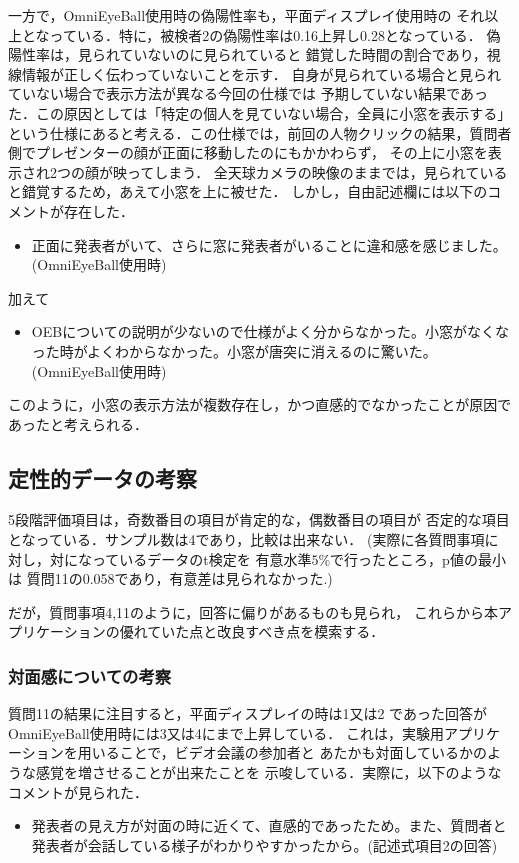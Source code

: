 一方で，OmniEyeBall使用時の偽陽性率も，平面ディスプレイ使用時の
それ以上となっている．特に，被検者2の偽陽性率は0.16上昇し0.28となっている．
偽陽性率は，見られていないのに見られていると
錯覚した時間の割合であり，視線情報が正しく伝わっていないことを示す．
自身が見られている場合と見られていない場合で表示方法が異なる今回の仕様では
予期していない結果であった．この原因としては「特定の個人を見ていない場合，全員に小窓を表示する」
という仕様にあると考える．この仕様では，前回の人物クリックの結果，質問者側でプレゼンターの顔が正面に移動したのにもかかわらず，
その上に小窓を表示され2つの顔が映ってしまう．
全天球カメラの映像のままでは，見られていると錯覚するため，あえて小窓を上に被せた．
しかし，自由記述欄には以下のコメントが存在した．
\begin{itemize}
  \item 正面に発表者がいて、さらに窓に発表者がいることに違和感を感じました。(OmniEyeBall使用時)
\end{itemize}
加えて
\begin{itemize}
  \item OEBについての説明が少ないので仕様がよく分からなかった。小窓がなくなった時がよくわからなかった。小窓が唐突に消えるのに驚いた。(OmniEyeBall使用時)
\end{itemize}
このように，小窓の表示方法が複数存在し，かつ直感的でなかったことが原因であったと考えられる．

\subsection*{定性的データの考察}
5段階評価項目は，奇数番目の項目が肯定的な，偶数番目の項目が
否定的な項目となっている．サンプル数は4であり，比較は出来ない．
(実際に各質問事項に対し，対になっているデータのt検定を
有意水準$5\%$で行ったところ，p値の最小は
質問11の0.058であり，有意差は見られなかった.)

だが，質問事項4,11のように，回答に偏りがあるものも見られ，
これらから本アプリケーションの優れていた点と改良すべき点を模索する．

\subsubsection*{対面感についての考察}
質問11の結果に注目すると，平面ディスプレイの時は1又は2
であった回答がOmniEyeBall使用時には3又は4にまで上昇している．
これは，実験用アプリケーションを用いることで，ビデオ会議の参加者と
あたかも対面しているかのような感覚を増させることが出来たことを
示唆している．実際に，以下のようなコメントが見られた．
\begin{itemize}
  \item 発表者の見え方が対面の時に近くて、直感的であったため。また、質問者と発表者が会話している様子がわかりやすかったから。(記述式項目2の回答)
\end{itemize}

